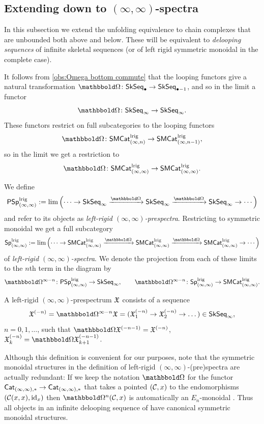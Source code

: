 \documentclass[a4paper,11pt]{article}
\begin{document}
\subsection{Extending down to $(\infty,\infty)$-spectra}
\label{sec:unbounded}

In this subsection we extend the unfolding equivalence to chain
complexes that are unbounded both above and below. These will be
equivalent to \emph{delooping sequences} of infinite skeletal
sequences (or of left rigid symmetric monoidal \iicats{} in the
complete case).

\begin{observation}
    It follows from \cref{obs:Omega bottom commute} that the looping
  functors give a natural transformation $\mOm \colon \SkSeq_{\bullet} \to
  \SkSeq_{\bullet-1}$, and so in the limit a functor
  \[ \mOm \colon \SkSeq_{\infty}  \to \SkSeq_{\infty}.\]
  These functors restrict on full subcategories to the looping
  functors
  \[ \mOm \colon \SMCatIn^{\lrig} \to \SMCatInm^{\lrig},\]
  so in the limit we get a restriction to 
  \[ \mOm \colon \SMCatII^{\lrig} \to
    \SMCatII^{\lrig}.\]
\end{observation}

\begin{defn}
  We define
  \[ \PSpIIl := \lim \left(\cdots \to \SkSeq_{\infty} \xto{\mOm}
      \SkSeq_{\infty} \xto{\mOm} \SkSeq_{\infty}
       \to \cdots \right) \]
  and refer to its objects as
  \emph{left-rigid $(\infty,\infty)$-prespectra}.
  Restricting to symmetric monoidal \iicats{} we get a full subcategory
  \[ \SpIIl := \lim \left(\cdots \to \SMCatII^{\lrig} \xto{\mOm}
      \SMCatII^{\lrig} \xto{\mOm}   \SMCatII^{\lrig} \to \cdots \right) \]
  of \emph{left-rigid $(\infty,\infty)$-spectra}.
  We denote the projection from each of these limits to the $n$th term in the
  diagram by
  \[ \mOm^{\infty-n} \colon \PSpIIl \to \SkSeq_{\infty}, \qquad \mOm^{\infty-n}
    \colon \SpIIl \to \SMCatII^{\lrig}.\]
\end{defn}

\begin{observation}
  A left-rigid $(\infty,\infty)$-prespectrum $\mathfrak{X}$ consists
  of a sequence \[\spX^{(-n)} = \mOm^{\infty-n}\spX = (\spX^{(-n)}_{1} \to \spX^{(-n)}_{2} \to
    \dots) \in \SkSeqI,\]
  $n = 0,1,\ldots$,
  such that $\mOm \spX^{(-n-1)} = \spX^{(-n)}$, \ie{} $\spX^{(-n)}_{k}
  = \mOm\spX^{(-n-1)}_{k+1}$.
\end{observation}

\begin{remark}
  Although this definition is convenient for our purposes, note that
  the symmetric monoidal structures in the definition of left-rigid
  $(\infty,\infty)$-(pre)spectra are actually redundant: If we keep
  the notation $\mOm$ for the functor
  $\Cat_{(\infty,\infty),*} \to \Cat_{(\infty,\infty),*}$ that takes a
  pointed \iicat{} $(\mathcal{C},x)$ to the endomorphisms $(\mathcal{C}(x,x), \text{\textup{id}}_{x})$ then
  $\mOm^{n}(\nC,x)$ is automatically an $E_{n}$-monoidal \iicat{}. Thus
  all objects in an infinite delooping sequence of \iicats{} have
  canonical symmetric monoidal structures.  
\end{remark}
\end{document}
